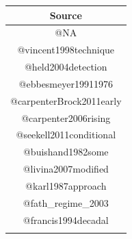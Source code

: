 \documentclass[12pt,twoside,openany]{reedthesis}
\begin{document}
\begin{longtable}[]{@{}c@{}}
\toprule
\begin{minipage}[b]{0.44\columnwidth}\centering\strut
Source\strut
\end{minipage}\tabularnewline
\midrule
\endhead
\begin{minipage}[t]{0.44\columnwidth}\centering\strut
@NA\strut
\end{minipage}\tabularnewline
\begin{minipage}[t]{0.44\columnwidth}\centering\strut
@vincent1998technique\strut
\end{minipage}\tabularnewline
\begin{minipage}[t]{0.44\columnwidth}\centering\strut
@held2004detection\strut
\end{minipage}\tabularnewline
\begin{minipage}[t]{0.44\columnwidth}\centering\strut
@ebbesmeyer19911976\strut
\end{minipage}\tabularnewline
\begin{minipage}[t]{0.44\columnwidth}\centering\strut
@carpenterBrock2011early\strut
\end{minipage}\tabularnewline
\begin{minipage}[t]{0.44\columnwidth}\centering\strut
@carpenter2006rising\strut
\end{minipage}\tabularnewline
\begin{minipage}[t]{0.44\columnwidth}\centering\strut
@seekell2011conditional\strut
\end{minipage}\tabularnewline
\begin{minipage}[t]{0.44\columnwidth}\centering\strut
@buishand1982some\strut
\end{minipage}\tabularnewline
\begin{minipage}[t]{0.44\columnwidth}\centering\strut
@livina2007modified\strut
\end{minipage}\tabularnewline
\begin{minipage}[t]{0.44\columnwidth}\centering\strut
@karl1987approach\strut
\end{minipage}\tabularnewline
\begin{minipage}[t]{0.44\columnwidth}\centering\strut
@fath\_regime\_2003\strut
\end{minipage}\tabularnewline
\begin{minipage}[t]{0.44\columnwidth}\centering\strut
@francis1994decadal\strut
\end{minipage}\tabularnewline
\begin{minipage}[t]{0.44\columnwidth}\centering\strut

\end{minipage}
\end{longtable}
\end{document}
